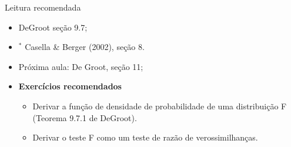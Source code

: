\begin{frame}{Leitura recomendada}
\begin{itemize}
 \item[\faBook] DeGroot seção 9.7;
 \item[\faBook] $^\ast$ Casella \& Berger (2002), seção 8.
 \item[\faForward] Próxima aula: De Groot, seção 11;
 \item {\large\textbf{Exercícios recomendados}}
  \begin{itemize}
   \item[\faBookmark] Derivar a função de densidade de probabilidade de uma distribuição F (Teorema 9.7.1 de DeGroot).
   \item[\faBookmark] Derivar o teste F como um teste de razão de verossimilhanças.
  \end{itemize}
 \end{itemize} 
\end{frame}
